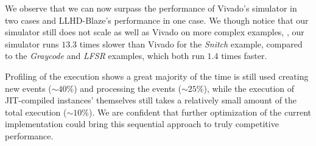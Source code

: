 We observe that we can now surpass the performance of Vivado's simulator in two cases and LLHD-Blaze's performance in one case. We though notice that our simulator still does not scale as well as Vivado on more complex examples, \eg, our simulator runs $13.3$ times slower than Vivado for the \textit{Snitch} example, compared to the \textit{Graycode} and \textit{LFSR} examples, which both run $1.4$ times faster.

Profiling of the execution shows a great majority of the time is still used creating new events ($\sim$$40\%$) and processing the events ($\sim$$25\%$), while the execution of JIT-compiled instances' themselves still takes a relatively small amount of the total execution ($\sim$$10\%$). We are confident that further optimization of the current implementation could bring this sequential approach to truly competitive performance.
